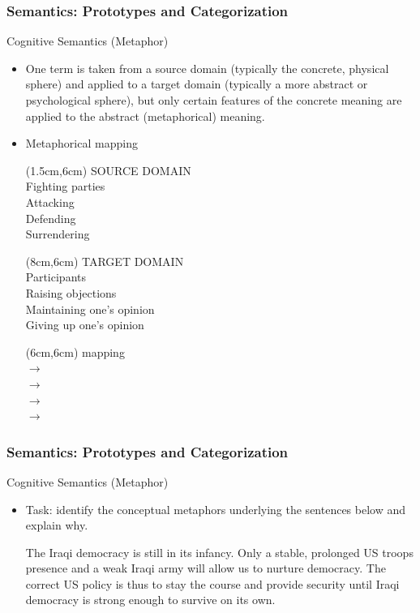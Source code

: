 \documentclass[12pt, table]{beamer}
\begin{document}
\begin{frame}
\frametitle{Semantics: Prototypes and Categorization}
Cognitive Semantics (Metaphor)
\begin{itemize}
\item One term is taken from a source domain (typically the concrete, physical sphere) and applied to a target domain (typically a more abstract or psychological sphere), but only certain features of the concrete meaning are applied to the abstract (metaphorical) meaning.
\item Metaphorical mapping\\[5cm]
\begin{textblock*}{5cm}(1.5cm,6cm)
SOURCE DOMAIN\\[.25cm]
Fighting parties\\
Attacking\\
Defending\\
Surrendering\\
\end{textblock*}
\begin{textblock*}{5cm}(8cm,6cm)
TARGET DOMAIN\\[.25cm]
Participants\\
Raising objections\\
Maintaining one's opinion\\
Giving up one's opinion\\
\end{textblock*}
\begin{textblock*}{5cm}(6cm,6cm)
mapping \\[.25cm]
$\rightarrow$ \\
$\rightarrow$ \\
$\rightarrow$ \\
$\rightarrow$ \\
\end{textblock*}
\end{itemize}
\end{frame}

\begin{frame}
\frametitle{Semantics: Prototypes and Categorization}
Cognitive Semantics (Metaphor)
\begin{itemize}
\item Task: identify the conceptual metaphors underlying the sentences below and explain why.\begin{exe}
\ex The Iraqi democracy is still in its infancy.
\ex Only a stable, prolonged US troops presence and a weak Iraqi army will allow us to nurture democracy.
\ex The correct US policy is thus to stay the course and provide security until Iraqi democracy is strong enough to survive on its own.
\end{exe}
\end{itemize}
\end{frame}
\end{document}
